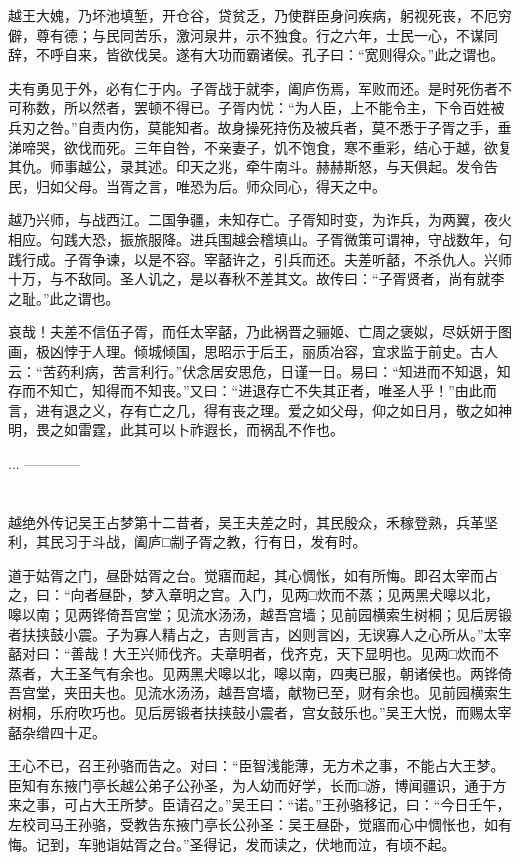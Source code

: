 \documentclass[12pt,UTF8]{ctexbook}
\begin{document}
越王大媿，乃坏池填堑，开仓谷，贷贫乏，乃使群臣身问疾病，躬视死丧，不厄穷僻，尊有德；与民同苦乐，激河泉井，示不独食。行之六年，士民一心，不谋同辞，不呼自来，皆欲伐吴。遂有大功而霸诸侯。孔子曰：“宽则得众。”此之谓也。

夫有勇见于外，必有仁于内。子胥战于就李，阖庐伤焉，军败而还。是时死伤者不可称数，所以然者，罢顿不得已。子胥内忧：“为人臣，上不能令主，下令百姓被兵刃之咎。”自责内伤，莫能知者。故身操死持伤及被兵者，莫不悉于子胥之手，垂涕啼哭，欲伐而死。三年自咎，不亲妻子，饥不饱食，寒不重彩，结心于越，欲复其仇。师事越公，录其述。印天之兆，牵牛南斗。赫赫斯怒，与天俱起。发令告民，归如父母。当胥之言，唯恐为后。师众同心，得天之中。

越乃兴师，与战西江。二国争疆，未知存亡。子胥知时变，为诈兵，为两翼，夜火相应。句践大恐，振旅服降。进兵围越会稽填山。子胥微策可谓神，守战数年，句践行成。子胥争谏，以是不容。宰嚭许之，引兵而还。夫差听嚭，不杀仇人。兴师十万，与不敌同。圣人讥之，是以春秋不差其文。故传曰：“子胥贤者，尚有就李之耻。”此之谓也。

哀哉！夫差不信伍子胥，而任太宰嚭，乃此祸晋之骊姬、亡周之褒姒，尽妖妍于图画，极凶悖于人理。倾城倾国，思昭示于后王，丽质冶容，宜求监于前史。古人云：“苦药利病，苦言利行。”伏念居安思危，日谨一日。易曰：“知进而不知退，知存而不知亡，知得而不知丧。”又曰：“进退存亡不失其正者，唯圣人乎！”由此而言，进有退之义，存有亡之几，得有丧之理。爱之如父母，仰之如日月，敬之如神明，畏之如雷霆，此其可以卜祚遐长，而祸乱不作也。

...
------------

\part{}

越绝外传记吴王占梦第十二昔者，吴王夫差之时，其民殷众，禾稼登熟，兵革坚利，其民习于斗战，阖庐□剬子胥之教，行有日，发有时。

道于姑胥之门，昼卧姑胥之台。觉寤而起，其心惆怅，如有所悔。即召太宰而占之，曰：“向者昼卧，梦入章明之宫。入门，见两□炊而不蒸；见两黑犬嗥以北，嗥以南；见两铧倚吾宫堂；见流水汤汤，越吾宫墙；见前园横索生树桐；见后房锻者扶挟鼓小震。子为寡人精占之，吉则言吉，凶则言凶，无谀寡人之心所从。”太宰嚭对曰：“善哉！大王兴师伐齐。夫章明者，伐齐克，天下显明也。见两□炊而不蒸者，大王圣气有余也。见两黑犬嗥以北，嗥以南，四夷已服，朝诸侯也。两铧倚吾宫堂，夹田夫也。见流水汤汤，越吾宫墙，献物已至，财有余也。见前园横索生树桐，乐府吹巧也。见后房锻者扶挟鼓小震者，宫女鼓乐也。”吴王大悦，而赐太宰嚭杂缯四十疋。

王心不已，召王孙骆而告之。对曰：“臣智浅能薄，无方术之事，不能占大王梦。臣知有东掖门亭长越公弟子公孙圣，为人幼而好学，长而□游，博闻疆识，通于方来之事，可占大王所梦。臣请召之。”吴王曰：“诺。”王孙骆移记，曰：“今日壬午，左校司马王孙骆，受教告东掖门亭长公孙圣：吴王昼卧，觉寤而心中惆怅也，如有悔。记到，车驰诣姑胥之台。”圣得记，发而读之，伏地而泣，有顷不起。
\end{document}
